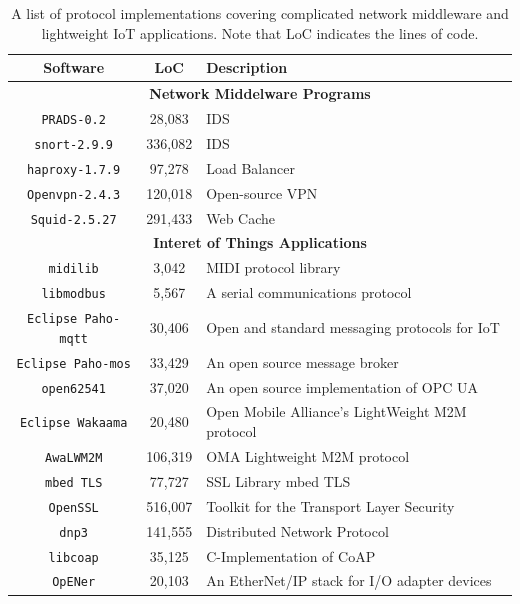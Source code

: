 
\begin{table}[t]
\centering
 \begin{tabular}{|c c l|} 
 \hline
 Software & LoC & Description \\  
 \hline\hline
 \multicolumn{3}{|c|}{\textbf{Network Middelware Programs}}\\
 \texttt{PRADS-0.2}             & 28,083      & IDS \\ 
 \texttt{snort-2.9.9}           & 336,082     & IDS \\ 
 \texttt{haproxy-1.7.9}         & 97,278      & Load Balancer \\ 
 \texttt{Openvpn-2.4.3}         & 120,018     & Open-source VPN \\
 \texttt{Squid-2.5.27}          & 291,433     & Web Cache\\
 \hline\hline
 \multicolumn{3}{|c|}{\textbf{Interet of Things Applications}}\\
 \texttt{midilib} & 3,042 & MIDI protocol library \\ 
 \texttt{libmodbus} & 5,567 & A serial communications protocol \\ 
 \texttt{Eclipse Paho-mqtt} & 30,406 & Open and standard messaging protocols for IoT \\ 
 \texttt{Eclipse Paho-mos} & 33,429 & An open source message broker \\ 
 \texttt{open62541} & 37,020 & An open source implementation of OPC UA \\ 
 \texttt{Eclipse Wakaama} & 20,480 & Open Mobile Alliance's LightWeight M2M protocol \\ 
 \texttt{AwaLWM2M} & 106,319 & OMA Lightweight M2M protocol \\ 
 \texttt{mbed TLS} & 77,727 & SSL Library mbed TLS \\ 
 \texttt{OpenSSL} & 516,007 & Toolkit for the Transport Layer Security \\ 
 \texttt{dnp3} & 141,555 & Distributed Network Protocol \\ 
 \texttt{libcoap} & 35,125 & C-Implementation of CoAP \\ 
 \texttt{OpENer} & 20,103 & An EtherNet/IP stack for I/O adapter devices \\ 
 \hline
 \end{tabular}
\caption {A list of protocol implementations covering complicated network
middleware and lightweight IoT applications. Note that LoC indicates the lines
of code.}
\label{tab:software}
\end{table}


